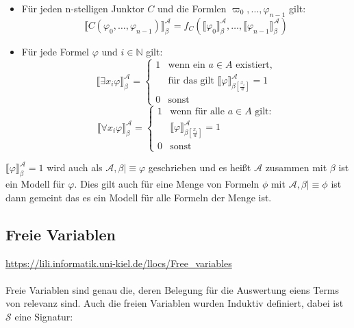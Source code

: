 \documentclass{article}
\newcommand{\model}{\mathrel{{\vert}\!{\equiv}}}
\begin{document}
    \begin{itemize}
        \item Für jeden n-stelligen Junktor $C$ und die Formlen $\varpi_0,...,\varphi_{n-1}$ gilt:
            $$ \llbracket C (\varphi_0,\dots,\varphi_{n-1})\rrbracket_{\beta}^{\mathcal A} = f_C(\llbracket \varphi_0 \rrbracket_{\beta}^{\mathcal A}, \dots,\llbracket \varphi_{n-1} \rrbracket_{\beta}^{\mathcal A}) $$
        \item Für jede Formel $\varphi$ und $i \in \mathbb N$ gilt:
            $$ \llbracket \exists x_i \varphi \rrbracket_{\beta}^{\mathcal A} = 
            \begin{cases}
                1 & \text{wenn ein } a \in A \text{ existiert,} \\ & \text{für das gilt } \llbracket \varphi \rrbracket_{\beta [\frac{x_i}{a}]}^{\mathcal A} = 1\\
                0 & \text{sonst}
            \end{cases}$$
            $$ \llbracket \forall x_i \varphi \rrbracket_{\beta}^{\mathcal A} = 
            \begin{cases}
                1 & \text{wenn für alle } a \in A \text{ gilt:} \\ &  \llbracket \varphi \rrbracket_{\beta [\frac{x_i}{a}]}^{\mathcal A} = 1\\
                0 & \text{sonst}
            \end{cases}$$
    \end{itemize}
    $ \llbracket \varphi \rrbracket_{\beta}^{\mathcal A} = 1$ wird auch als $\mathcal A, \beta \model \varphi$ geschrieben und es heißt $\mathcal A$ zusammen mit $\beta$ ist ein Modell für $\varphi$. Dies gilt auch für eine Menge von Formeln $\phi$ mit $\mathcal A, \beta \model \phi$ ist dann gemeint das es ein Modell für alle Formeln der Menge ist.

    \subsection{Freie Variablen}
    \url{https://lili.informatik.uni-kiel.de/llocs/Free_variables}\\\\
    Freie Variablen sind genau die, deren Belegung für die Auswertung eiens Terms von relevanz sind. Auch die freien Variablen wurden Induktiv definiert, dabei ist $\mathcal S$ eine Signatur:\\\\
\end{document}
